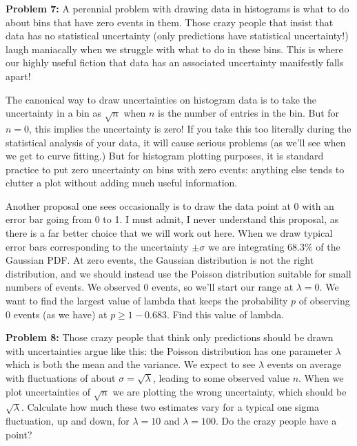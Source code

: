 \documentclass[12pt,oneside]{book}
\begin{document}
\noindent
{\bf Problem 7:}  A perennial problem with drawing data in histograms is what to do about bins that have zero events in them.  Those crazy people that insist that data has no statistical uncertainty (only predictions have statistical uncertainty!) laugh maniacally when we struggle with what to do in these bins.  This is where our highly useful fiction that data has an associated uncertainty manifestly falls apart! 

The canonical way to draw uncertainties on histogram data is to take the uncertainty in a bin as $\sqrt{n}$ when $n$ is the number of entries in the bin.  But for $n=0$, this implies the uncertainty is zero!  If you take this too literally during the statistical analysis of your data, it will cause serious problems (as we'll see when we get to curve fitting.)   But for histogram plotting purposes, it is standard practice to put zero uncertainty on bins with zero events:  anything else tends to clutter a plot without adding much useful information. 

Another proposal one sees occasionally is to draw the data point at 0 with an error bar going from 0 to 1.  I must admit, I never understand this proposal, as there is a far better choice that we will work out here.
When we draw typical error bars corresponding to the uncertainty $\pm\sigma$ we are integrating $68.3\%$ of the Gaussian PDF.  At zero events, the Gaussian distribution is not the right distribution, and we should instead use the Poisson distribution suitable for small numbers of events.  We observed 0 events, so we'll start our range at $\lambda = 0$.  We want to find the largest value of lambda that keeps the probability $p$ of observing 0 events (as we have) at  $p \geq 1-0.683$.  Find this value of lambda. \\
\vskip 0.25cm

\noindent
{\bf Problem 8:}  Those crazy people that think only predictions should be drawn with uncertainties argue like this: the Poisson distribution has one parameter $\lambda$ which is both the mean and the variance.  We expect to see $\lambda$ events on average with fluctuations of about $\sigma = \sqrt{\lambda}$, leading to some observed value $n$.  When we plot uncertainties of $\sqrt{n}$ we are plotting the wrong uncertainty, which should be $\sqrt{\lambda}$.  Calculate how much these two estimates vary for a typical one sigma fluctuation, up and down, for $\lambda=10$ and $\lambda=100$.  Do the crazy people have a point? \\ \vskip 0.25cm
\end{document}
